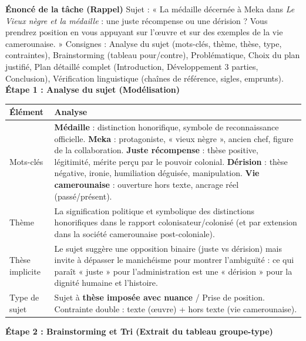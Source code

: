 \documentclass[11pt]{article}
\begin{document}
\begin{exoresolu}
\textbf{Énoncé de la tâche (Rappel)}
Sujet : « La médaille décernée à Meka dans \emph{Le Vieux nègre et la médaille} : une juste récompense ou une dérision ? Vous prendrez position en vous appuyant sur l'œuvre et sur des exemples de la vie camerounaise. »
Consignes : Analyse du sujet (mots-clés, thème, thèse, type, contraintes), Brainstorming (tableau pour/contre), Problématique, Choix du plan justifié, Plan détaillé complet (Introduction, Développement 3 parties, Conclusion), Vérification linguistique (chaînes de référence, sigles, emprunts).
\tcblower
\textbf{Étape 1 : Analyse du sujet (Modélisation)}

\begin{center}
\begin{tabularx}{\linewidth}{|l|X|}\hline
\textbf{Élément} & \textbf{Analyse} \\ \hline
Mots-clés & \textbf{Médaille} : distinction honorifique, symbole de reconnaissance officielle. \textbf{Meka} : protagoniste, « vieux nègre », ancien chef, figure de la collaboration. \textbf{Juste récompense} : thèse positive, légitimité, mérite perçu par le pouvoir colonial. \textbf{Dérision} : thèse négative, ironie, humiliation déguisée, manipulation. \textbf{Vie camerounaise} : ouverture hors texte, ancrage réel (passé/présent). \\ \hline
Thème & La signification politique et symbolique des distinctions honorifiques dans le rapport colonisateur/colonisé (et par extension dans la société camerounaise post-coloniale). \\ \hline
Thèse implicite & Le sujet suggère une opposition binaire (juste vs dérision) mais invite à dépasser le manichéisme pour montrer l'ambiguïté : ce qui paraît « juste » pour l'administration est une « dérision » pour la dignité humaine et l'histoire. \\ \hline
Type de sujet & Sujet à \textbf{thèse imposée avec nuance} / Prise de position. Contrainte double : texte (œuvre) + hors texte (vie camerounaise). \\ \hline
\end{tabularx}
\end{center}

\textbf{Étape 2 : Brainstorming et Tri (Extrait du tableau groupe-type)}


\end{exoresolu}
\end{document}
